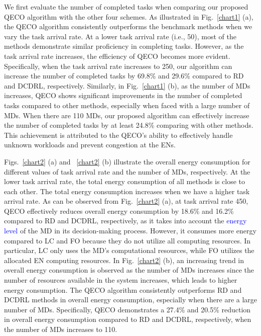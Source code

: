 \documentclass[10pt, journal,letterpaper]{IEEEtran}
\begin{document}
We first evaluate the number of completed tasks when comparing our proposed QECO algorithm with the other four schemes. As illustrated in Fig.~\ref{chart1} (a), the QECO algorithm consistently outperforms the benchmark methods when we vary the task arrival rate. At a lower task arrival rate (i.e., 50), most of the methods demonstrate similar proficiency in completing tasks. However, as the task arrival rate increases, the efficiency of QECO becomes more evident. Specifically, when the task arrival rate increases to 250, our algorithm can increase the number of completed tasks by 69.8\% and 29.6\% compared to RD and DCDRL, respectively.
Similarly, in Fig.~\ref{chart1} (b), as the number of MDs increases, QECO shows significant improvements in the number of completed tasks compared to other methods, especially when faced with a large number of MDs. When there are 110 MDs, our proposed algorithm can effectively increase the number of completed tasks by at least 24.8\% comparing with other methods. This achievement is attributed to the QECO's ability to effectively handle unknown workloads and prevent congestion at the ENs.

Figs.~\ref{chart2} (a) and ~\ref{chart2} (b) illustrate the overall energy consumption for different values of task arrival rate and the number of MDs, respectively. At the lower task arrival rate, the total energy consumption of all methods is close to each other. The total energy consumption increases when we have a higher task arrival rate.  
As can be observed from Fig.~\ref{chart2} (a), at task arrival rate 450, QECO effectively reduces overall energy consumption by 18.6\% and 16.2\% compared to RD and DCDRL, respectively, as it takes into account the \textcolor{blue}{energy level} of the MD in its decision-making process. However, it consumes more energy compared to LC and FO because they do not utilize all computing resources. In particular, LC only uses the MD's computational resources, while FO utilizes the allocated EN computing resources. 
In Fig.~\ref{chart2} (b), an increasing trend in overall energy consumption is observed as the number of MDs increases since the number of resources available in the system increases, which leads to higher energy consumption. The QECO algorithm consistently outperforms RD and DCDRL methods in overall energy consumption, especially when there are a large number of MDs. Specifically, QECO demonstrates a 27.4\% and 20.5\% reduction in overall energy consumption compared to RD and DCDRL, respectively, when the number of MDs increases to 110.
\end{document}
